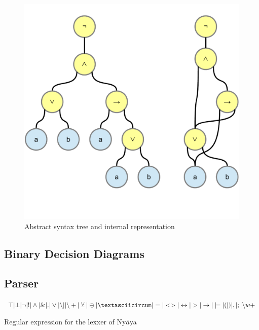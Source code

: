 \begin{figure}[htbp]
\begin{center}
\includegraphics[scale=0.5]{diagrams/AcyclicSyntaxGraph.pdf}
\caption{Abstract syntax tree and internal representation}
\label{fig:NyayaNodeDisplay}
\end{center}
\end{figure}

\subsection{Binary Decision Diagrams}

\subsection{Parser}


\cite{Louden:1997:CCP:523017}

\begin{table}[htdp]
\begin{center}
$\top | \bot 
| \neg | !
| \wedge | \& | .
| \vee | {\setminus}| | {\setminus}+ 
| \veebar | \oplus | \textasciicircum
| = | <> | \leftrightarrow 
| > | \rightarrow | \models
| ( | ) | , | ; 
| {\setminus}w+$ 
\caption{Regular expression for the lexxer of Ny$\bar{a}$ya}
\label{tab:REGEX}
\end{center}
\end{table}


